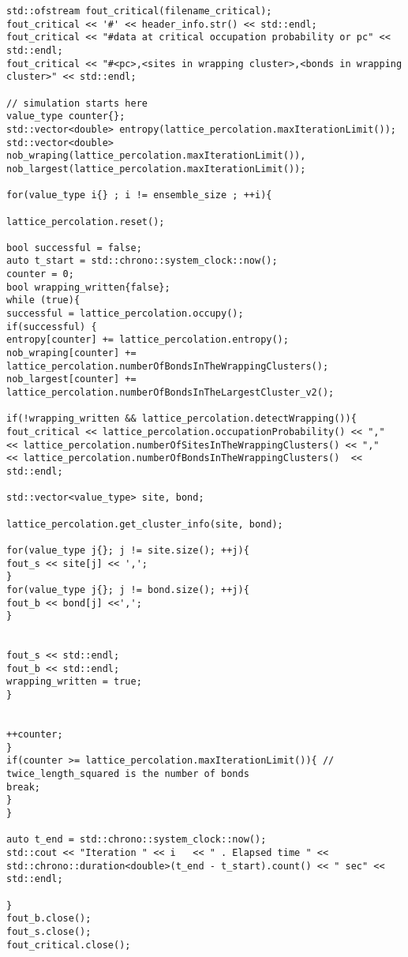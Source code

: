 \begin{lstlisting}[style=CStyle]
std::ofstream fout_critical(filename_critical);
fout_critical << '#' << header_info.str() << std::endl;
fout_critical << "#data at critical occupation probability or pc" << std::endl;
fout_critical << "#<pc>,<sites in wrapping cluster>,<bonds in wrapping cluster>" << std::endl;

// simulation starts here
value_type counter{};
std::vector<double> entropy(lattice_percolation.maxIterationLimit());
std::vector<double> nob_wraping(lattice_percolation.maxIterationLimit()),
nob_largest(lattice_percolation.maxIterationLimit());

for(value_type i{} ; i != ensemble_size ; ++i){

lattice_percolation.reset();

bool successful = false;
auto t_start = std::chrono::system_clock::now();
counter = 0;
bool wrapping_written{false};
while (true){
successful = lattice_percolation.occupy();
if(successful) {
entropy[counter] += lattice_percolation.entropy();
nob_wraping[counter] += lattice_percolation.numberOfBondsInTheWrappingClusters();
nob_largest[counter] += lattice_percolation.numberOfBondsInTheLargestCluster_v2();

if(!wrapping_written && lattice_percolation.detectWrapping()){
fout_critical << lattice_percolation.occupationProbability() << ","
<< lattice_percolation.numberOfSitesInTheWrappingClusters() << ","
<< lattice_percolation.numberOfBondsInTheWrappingClusters()  << std::endl;

std::vector<value_type> site, bond;

lattice_percolation.get_cluster_info(site, bond);

for(value_type j{}; j != site.size(); ++j){
fout_s << site[j] << ',';
}
for(value_type j{}; j != bond.size(); ++j){
fout_b << bond[j] <<',';
}


fout_s << std::endl;
fout_b << std::endl;
wrapping_written = true;
}


++counter;
}
if(counter >= lattice_percolation.maxIterationLimit()){ // twice_length_squared is the number of bonds
break;
}
}

auto t_end = std::chrono::system_clock::now();
std::cout << "Iteration " << i   << " . Elapsed time " << std::chrono::duration<double>(t_end - t_start).count() << " sec" << std::endl;

}
fout_b.close();
fout_s.close();
fout_critical.close();



\end{lstlisting}
